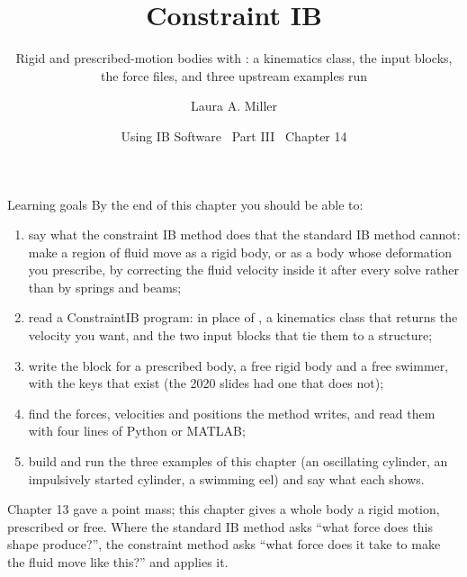 \documentclass[aspectratio=169,11pt]{beamer}
\title[Constraint IB]{Constraint IB}
\subtitle{Rigid and prescribed-motion bodies with \code{ConstraintIBMethod}: a kinematics class, the input blocks, the force files, and three upstream examples run}
\author[Miller]{Laura A. Miller}
\institute[UArizona]{Department of Mathematics, University of Arizona}
\date{Using IB Software \textbullet\ Part III \textbullet\ Chapter 14}
\begin{document}
\begin{frame}[plain]
\end{frame}

\begin{frame}{Learning goals}
\label{fr:goals}
\footnotesize By the end of this chapter you should be able to:
\begin{enumerate}
  \item say what the constraint IB method does that the standard IB method cannot: make a region of fluid move as a rigid body, or as a body whose deformation you prescribe, by correcting the fluid velocity inside it after every solve rather than by springs and beams;
  \item read a ConstraintIB program:  in place of , a kinematics class that returns the velocity you want, and the two input blocks that tie them to a structure;
  \item write the  block for a prescribed body, a free rigid body and a free swimmer, with the keys that exist (the 2020 slides had one that does not);
  \item find the forces, velocities and positions the method writes, and read them with four lines of Python or MATLAB;
  \item build and run the three examples of this chapter (an oscillating cylinder, an impulsively started cylinder, a swimming eel) and say what each shows.
\end{enumerate}
\begin{punchbox}
\footnotesize Chapter 13 gave a point mass; this chapter gives a whole body a rigid motion, prescribed or free. Where the standard IB method asks ``what force does this shape produce?'', the constraint method asks ``what force does it take to make the fluid move like this?'' and applies it.
\end{punchbox}
\end{frame}
\end{document}
